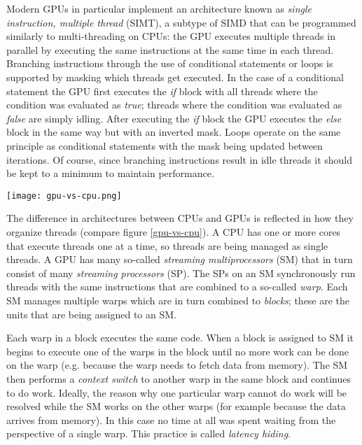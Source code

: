 Modern GPUs in particular implement an architecture known as \textit{single instruction, multiple thread} (SIMT),
a subtype of SIMD that can be programmed similarly to multi-threading on CPUs:
the GPU executes multiple threads in parallel by executing the same instructions at the same time in each thread.
Branching instructions through the use of conditional statements or loops is supported by masking which threads get executed.
In the case of a conditional statement the GPU first executes the \textit{if} block with
all threads where the condition was evaluated as \textit{true};
threads where the condition was evaluated as \textit{false} are simply idling.
After executing the \textit{if} block the GPU executes the \textit{else} block in the same way but with an inverted mask.
Loops operate on the same principle as conditional statements with the mask being updated between iterations.
Of course, since branching instructions result in idle threads it should be kept to a minimum to maintain performance.
\begin{figure*}
	\texttt{[image: gpu-vs-cpu.png]}
	\caption{
		Graphical representation of the analogy between hardware and thread model on CPUs and GPUs.
		Each CPU core can work on one thread at a time, so threads are managed individually.
		Each SM can work on multiple threads at once so threads are managed as warps.
		Warps are in turn grouped together as blocks.
	}
	\label{gpu-vs-cpu}
\end{figure*}

The difference in architectures between CPUs and GPUs is reflected in how they organize threads (compare figure \ref{gpu-vs-cpu}).
A CPU has one or more cores that execute threads one at a time, so threads are being managed as single threads.
A GPU has many so-called \textit{streaming multiprocessors} (SM) that in turn consist of many \textit{streaming processors} (SP).
The SPs on an SM synchronously run threads with the same instructions that are combined to a so-called \textit{warp}.
Each SM manages multiple warps which are in turn combined to \textit{blocks};
these are the units that are being assigned to an SM.

Each warp in a block executes the same code.
When a block is assigned to SM it begins to execute one of the warps in the block until no more work can be done on the warp
(e.g. because the warp needs to fetch data from memory).
The SM then performs a \textit{context switch} to another warp in the same block and continues to do work.
Ideally, the reason why one particular warp cannot do work will be resolved while the SM works on the other warps
(for example because the data arrives from memory).
In this case no time at all was spent waiting from the perspective of a single warp.
This practice is called \textit{latency hiding}.

